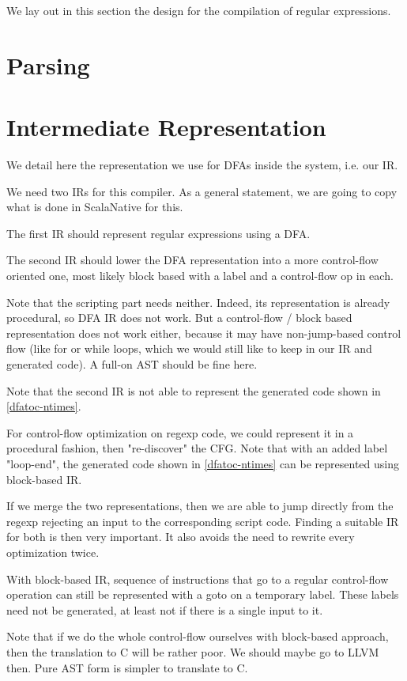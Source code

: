 \documentclass[11pt,a4paper]{report}
\begin{document}
We lay out in this section the design for the compilation of regular expressions.

\section{Parsing}

\section{Intermediate Representation}
\label{ir}

We detail here the representation we use for DFAs inside the system, i.e. our IR.

We need two IRs for this compiler. As a general statement, we are going to copy what is done in ScalaNative for this.

The first IR should represent regular expressions using a DFA.

The second IR should lower the DFA representation into a more control-flow oriented one, most likely block based with a label and a control-flow op in each.

Note that the scripting part needs neither. Indeed, its representation is already procedural, so DFA IR does not work. But a control-flow / block based representation does not work either,  because it may have non-jump-based control flow (like for or while loops, which we would still like to keep in our IR and generated code). A full-on AST should be fine here.

Note that the second IR is not able to represent the generated code shown in \ref{dfatoc-ntimes}.

For control-flow optimization on regexp code, we could represent it in a procedural fashion, then "re-discover" the CFG. Note that with an added label "loop-end", the generated code shown in \ref{dfatoc-ntimes} can be represented using block-based IR.

If we merge the two representations, then we are able to jump directly from the regexp rejecting an input to the corresponding script code. Finding a suitable IR for both is then very important. It also avoids the need to rewrite every optimization twice.

With block-based IR, sequence of instructions that go to a regular control-flow operation can still be represented with a goto on a temporary label. These labels need not be generated, at least not if there is a single input to it.

Note that if we do the whole control-flow ourselves with block-based approach, then the translation to C will be rather poor. We should maybe go to LLVM then. Pure AST form is simpler to translate to C.
\end{document}
